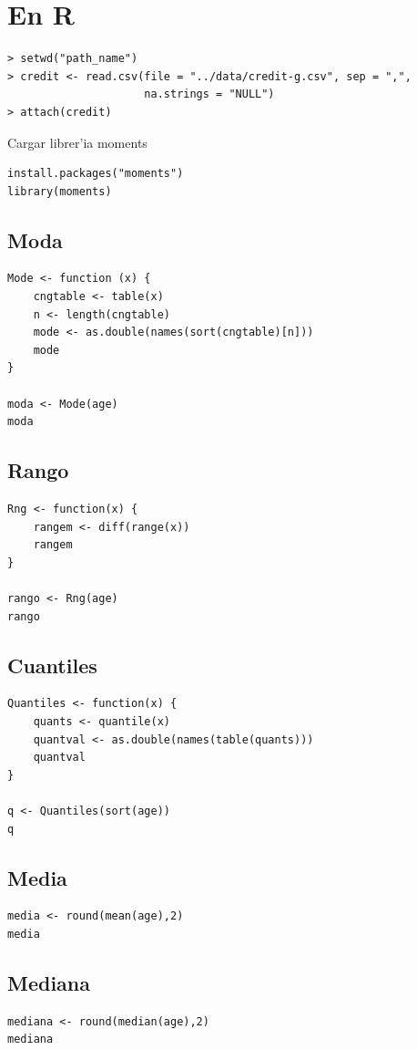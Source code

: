 \section{En R}
\begin{verbatim}
> setwd("path_name")
> credit <- read.csv(file = "../data/credit-g.csv", sep = ",",
                     na.strings = "NULL")
> attach(credit)
\end{verbatim}

Cargar librer'ia moments
\begin{verbatim}
install.packages("moments")
library(moments)      
\end{verbatim}

\subsection{Moda}
\begin{verbatim}
Mode <- function (x) {
    cngtable <- table(x)
    n <- length(cngtable)
    mode <- as.double(names(sort(cngtable)[n]))
    mode
}

moda <- Mode(age)
moda
\end{verbatim}
\subsection{Rango}
\begin{verbatim}
Rng <- function(x) {
    rangem <- diff(range(x))
    rangem
}

rango <- Rng(age)
rango
\end{verbatim}
\subsection{Cuantiles}
\begin{verbatim}
Quantiles <- function(x) {
    quants <- quantile(x)
    quantval <- as.double(names(table(quants)))
    quantval
}

q <- Quantiles(sort(age))
q
\end{verbatim}

\subsection{Media}
\begin{verbatim}
media <- round(mean(age),2)
media
\end{verbatim}

\subsection{Mediana}
\begin{verbatim}
mediana <- round(median(age),2)
mediana
\end{verbatim}

